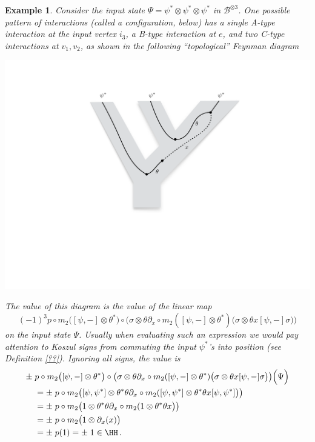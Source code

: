 \documentclass[english,letter paper,12pt,leqno]{article}
\theoremstyle{example}
\newtheorem{example}[theorem]{Example}
\numberwithin{equation}{section}
\def\be{\begin{equation}}
\def\ee{\end{equation}}
\begin{document}
\begin{example}
Consider the input state $\Psi = \psi^* \otimes \psi^* \otimes \psi^*$ in $\mathscr{B}^{\otimes 3}$. One possible pattern of interactions (called a configuration, below) has a single A-type interaction at the input vertex $i_3$, a B-type interaction at $e$, and two C-type interactions at $v_1,v_2$, as shown in the following ``topological'' Feynman diagram
\begin{center}
\includegraphics[scale=0.3]{dia6}
\end{center}
The \emph{value} of this diagram is the value of the linear map
\be\label{eq:operator_tree_example}
(-1)^3 p \circ m_2 \big([\psi, -] \otimes \theta^*\big) \circ \big( \sigma \otimes \theta \partial_x \circ m_2 ([\psi, -] \otimes \theta^*)\big( \sigma \otimes \theta x [\psi, -] \sigma \big)\big)
\ee
on the input state $\Psi$. Usually when evaluating such an expression we would pay attention to Koszul signs from commuting the input $\psi^*$'s into position (see Definition \ref{??}). Ignoring all signs, the value is
\begin{align*}
\pm \; & p \circ m_2 \big([\psi, -] \otimes \theta^*\big) \circ \big( \sigma \otimes \theta \partial_x \circ m_2 ([\psi, -] \otimes \theta^*)\big( \sigma \otimes \theta x [\psi, -] \sigma \big)\big)\Big( \Psi \Big)\\
&= \pm \; p \circ m_2 \big([\psi, \psi^*] \otimes \theta^* \theta \partial_x \circ m_2 ([\psi, \psi^*] \otimes \theta^* \theta x [\psi, \psi^*] \big)\big)\\
&= \pm \; p \circ m_2 \big(1 \otimes \theta^* \theta \partial_x \circ m_2 (1 \otimes \theta^* \theta x \big)\big)\\
&= \pm \; p \circ m_2 \big(1 \otimes \partial_x(x) \big)\\
&= \pm \; p(1) = \pm \; 1 \in \HH\,.
\end{align*}
\end{example}
\end{document}
